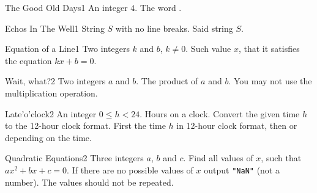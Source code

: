 \begin{task}{The Good Old Days}{1}
\In
An integer $4$.
\Out
The word .

\begin{ExampleIO}
\end{ExampleIO}
\end{task}

\begin{task}{Echos In The Well}{1}
\In
String $S$ with no line breaks.
\Out
Said string $S$.

\begin{ExampleIO}
\end{ExampleIO}
\end{task}

\begin{task}{Equation of a Line}{1}
\In
Two integers $k$ and $b$, $k \neq 0$.
\Out
Such value $x$, that it satisfies the equation $kx+b=0$. 
\end{task}

\begin{task}{Wait, what?}{2}
\In
Two integers $a$ and $b$.
\Out
The product of $a$ and $b$.
\Note
You may not use the multiplication operation.

\begin{ExampleIO}
\end{ExampleIO}
\end{task}

\begin{task}{Late'o'clock}{2}
\In An integer $0 \leq h < 24$. Hours on a clock.
\Note Convert the given time $h$ to the 12-hour clock format.
\Out First the time $h$ in 12-hour clock format, then  or 
depending on the time.

\begin{ExampleIO}
\end{ExampleIO}

\end{task}

\begin{task}{Quadratic Equations}{2}
\In
Three integers $a$, $b$ and $c$.
\Out
Find all values of $x$, such that $ax^2 + bx + c=0$. 
\Note
If there are no possible values of $x$ output \texttt{"NaN"} (not a number). 
The values should not be repeated.

\begin{ExampleIO}
\end{ExampleIO}

\end{task}

